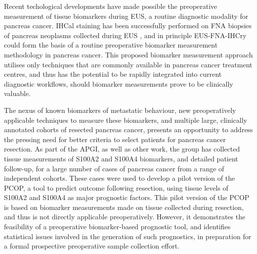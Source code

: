 \documentclass[dissertation.tex]{subfiles}
\begin{document}
Recent techological developments have made possible the preoperative measurement of tissue biomarkers during \gls{EUS}, a routine diagnostic modality for pancreas cancer.  \Gls{IHCal} staining has been successfully performed on \gls{FNA} biopsies of pancreas neoplasms collected during \gls{EUS} \cite{Popescu2012, Salla2009, Stelow2005}, and in principle \gls{EUS}-\gls{FNA}-\acrshort{IHCry} could form the basis of a routine preoperative biomarker measurement methodology in pancreas cancer.  This proposed biomarker measurement approach utilises only techniques that are commonly available in pancreas cancer treatment centres, and thus has the potential to be rapidly integrated into current diagnostic workflows, should biomarker measurements prove to be clinically valuable.

The nexus of known biomarkers of metastatic behaviour, new preoperatively applicable techniques to measure these biomarkers, and multiple large, clinically annotated cohorts of resected pancreas cancer, presents an opportunity to address the pressing need for better criteria to select patients for pancreas cancer resection.  As part of the \gls{APGI}, as well as other work, the group has collected tissue measurements of S100A2 and S100A4 biomarkers, and detailed patient follow-up, for a large number of cases of pancreas cancer from a range of independent cohorts.  These cases were used to develop a pilot version of the \gls{PCOP}, a tool to predict outcome following resection, using tissue levels of S100A2 and S100A4 as major prognostic factors.  This pilot version of the \gls{PCOP} is based on biomarker measurements made on tissue collected during resection, and thus is not directly applicable preoperatively.  However, it demonstrates the feasibility of a preoperative biomarker-based prognostic tool, and identifies statistical issues involved in the generation of such prognostics, in preparation for a formal prospective preoperative sample collection effort.
\end{document}
